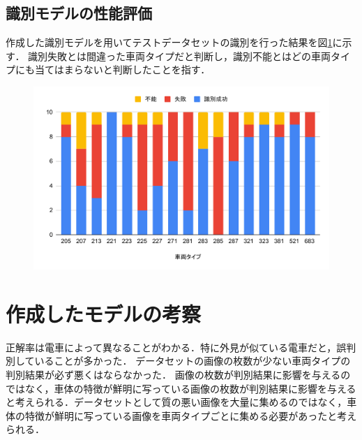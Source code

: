\begin{multicols*}{2}
\subsection{識別モデルの性能評価}
作成した識別モデルを用いてテストデータセットの識別を行った結果を図\ref{fig:chartdet}に示す．
識別失敗とは間違った車両タイプだと判断し，識別不能とはどの車両タイプにも当てはまらないと判断したことを指す．
\begin{figure}
	\centering
	\includegraphics[width=\linewidth]{obj/chartDET.pdf}
	\label{fig:chartdet}
\end{figure}





\section{作成したモデルの考察}
正解率は電車によって異なることがわかる．特に外見が似ている電車だと，誤判別していることが多かった．
データセットの画像の枚数が少ない車両タイプの判別結果が必ず悪くはならなかった．
画像の枚数が判別結果に影響を与えるのではなく，車体の特徴が鮮明に写っている画像の枚数が判別結果に影響を与えると考えられる．データセットとして質の悪い画像を大量に集めるのではなく，車体の特徴が鮮明に写っている画像を車両タイプごとに集める必要があったと考えられる．




\end{multicols*}
